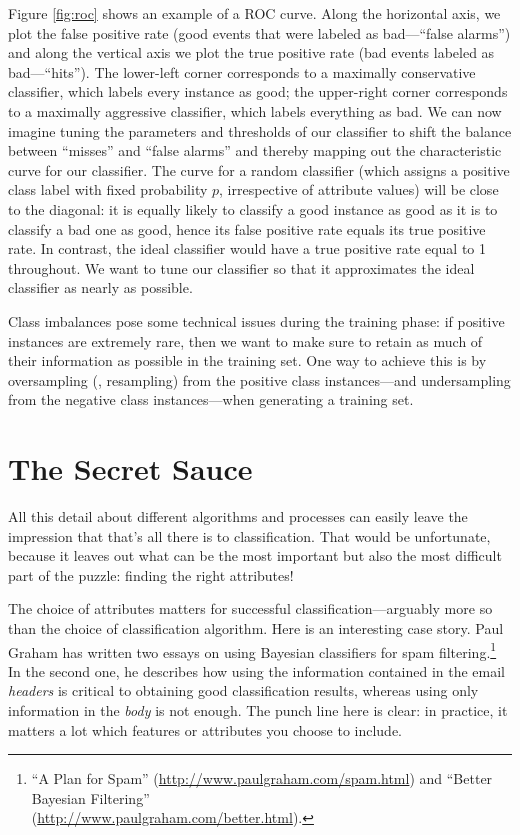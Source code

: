 Figure \ref{fig:roc} shows an example of a ROC curve. Along the
horizontal axis, we plot the false positive rate (good events that were
labeled as bad---``false alarms'') and along the vertical axis we plot
the true positive rate (bad events labeled as bad---``hits'').  The
lower-left corner corresponds to a maximally conservative classifier,
which labels every instance as good; the upper-right corner
corresponds to a maximally aggressive classifier, which labels
everything as bad. We can now imagine tuning the parameters and
thresholds of our classifier to shift the balance between ``misses''
and ``false alarms'' and thereby mapping out the characteristic curve
for our classifier.\vadjust{\pagebreak}  The curve for a random classifier (which assigns
a positive class label with fixed probability $p$, irrespective of
attribute values) will be close to the diagonal: it is equally likely
to classify a good instance as good as it is to classify a bad one as
good, hence its false positive rate equals its true positive rate. In
contrast, the ideal classifier would have a true positive rate equal
to 1 throughout.  We want to tune our classifier so that it
approximates the ideal classifier as nearly as possible.

Class imbalances pose some technical issues during the training phase:
if positive instances are extremely rare, then we want to make sure to
retain as much of their information as possible in the training set.
One way to achieve this is by oversampling (\ie, resampling) from the
positive class instances---and undersampling from the negative class
instances---when generating a training set. 

\section{The Secret Sauce}

 
All this detail about different algorithms and processes can easily
leave the impression that that's all there is to classification. That
would be unfortunate, because it leaves out what can be the most
important but also the most difficult part of the puzzle: finding the
right attributes!

The choice of attributes matters for successful
classification---arguably more so than the choice of classification
algorithm.  Here is an interesting case story. Paul Graham has written
two essays on using Bayesian classifiers for spam
filtering.\footnote{``A Plan for Spam''
  (\url{http://www.paulgraham.com/spam.html}) and ``Better Bayesian
  Filtering''\\ (\url{http://www.paulgraham.com/better.html}).} In the
second one, he describes how using the information contained in the
email \emph{headers} is critical to obtaining good classification
results, whereas using only information in the \emph{body} is not
enough. The punch line here is clear: in practice, it matters a lot
which features or attributes you choose to include.

